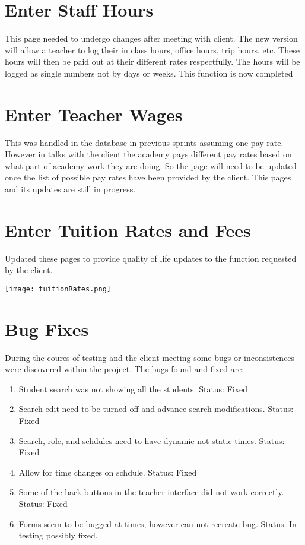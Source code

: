 \documentclass[11pt]{book}
\begin{document}
\section{Enter Staff Hours}
This page needed to undergo changes after meeting with client. The new version will allow a teacher to log their in class hours, office hours, trip hours, etc. These hours will then be paid out at their different rates respectfully. The hours will be logged as single numbers not by days or weeks. This function is now completed

\section{Enter Teacher Wages}
This was handled in the database in previous sprints assuming one pay rate. However in talks with the client the academy pays different pay rates based on what part of academy work they are doing. So the page will need to be updated once the list of possible pay rates have been provided by the client. This pages and its updates are still in progress. 

\section{Enter Tuition Rates and Fees}
Updated these pages to provide quality of life updates to the function requested by the client.

\texttt{[image: tuitionRates.png]}

\section{Bug Fixes}
During the coures of testing and the client meeting some bugs or inconsistences were discovered within the project. The bugs found and fixed are:

\begin{enumerate}
\item Student search was not showing all the students. Status: Fixed
\item Search edit need to be turned off and advance search modifications. Status: Fixed
\item Search, role, and schdules need to have dynamic not static times. Status: Fixed
\item Allow for time changes on schdule. Status: Fixed
\item Some of the back buttons in the teacher interface did not work correctly. Status: Fixed
\item Forms seem to be bugged at times, however can not recreate bug. Status: In testing possibly fixed.  
\end{enumerate}
\end{document}
